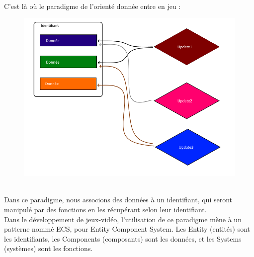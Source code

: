 \documentclass[12pt, openany]{report}
\begin{document}
\\
\indent C'est l\`a o\`u le paradigme de l'orient\'e donn\'ee entre en jeu : \\[0.2cm]
\begin{figure}[!h]
\centering
\includegraphics[scale=0.7]{illustrationOD.png}
\end{figure}
\\[0.5cm]
Dans ce paradigme, nous associons des donn\'ees \`a un identifiant, qui seront manipul\'e par des fonctions en les r\'ecup\'erant selon leur identifiant.
\\Dans le d\'eveloppement de jeux-vid\'eo, l'utilisation de ce paradigme m\`ene \`a un patterne nomm\'e ECS, pour Entity Component System. Les Entity (entit\'es) sont les identifiants, les Components (composants) sont les donn\'ees, et les Systems (syst\`emes) sont les fonctions.
\end{document}
